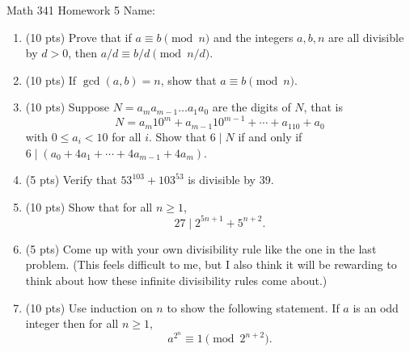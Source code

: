 \documentclass[12pt]{article}
\begin{document}
	Math 341 Homework 5
	\hfill
	Name: \underline{\hspace*{2in}}
	
\begin{enumerate}
	\item  (10 pts) Prove that if $a\equiv b\pmod n$ and the integers $a,b,n$ are all divisible by $d>0$, then $a/d\equiv b/d\pmod{n/d}$.
	\vfill
	\item (10 pts) If $\gcd(a,b)=n$, show that $a\equiv b\pmod n$.
	\vfill 
	\newpage
	\item (10 pts) Suppose $N=a_ma_{m-1}\dots a_1a_0$ are the digits of $N$, that is 
		$$N= a_m10^m+a_{m-1}10^{m-1}+\cdots+a_110+a_0$$ with $0\leq a_i<10$ for all $i$. Show that $6\mid N$ if and only if $6\mid (a_0+4a_1+\cdots + 4a_{m-1}+4a_m)$.
	\vfill
	\item (5 pts) Verify that $53^{103}+103^{53}$ is divisible by 39.
	\vfill
	\newpage
	\item (10 pts) Show that for all $n\geq 1$, 
			$$27\mid 2^{5n+1}+5^{n+2}.$$
	\vfill
	\item (5 pts) Come up with your own divisibility rule like the one in the last problem. (This feels difficult to me, but I also think it will be rewarding to think about how these infinite divisibility rules come about.)
	\vfill
	\newpage
	\item (10 pts) Use induction on $n$ to show the following statement. If $a$ is an odd integer then for all $n\geq 1$, 
			$$a^{2^n}\equiv 1\pmod{2^{n+2}}.$$
\end{enumerate}
		
\end{document}
